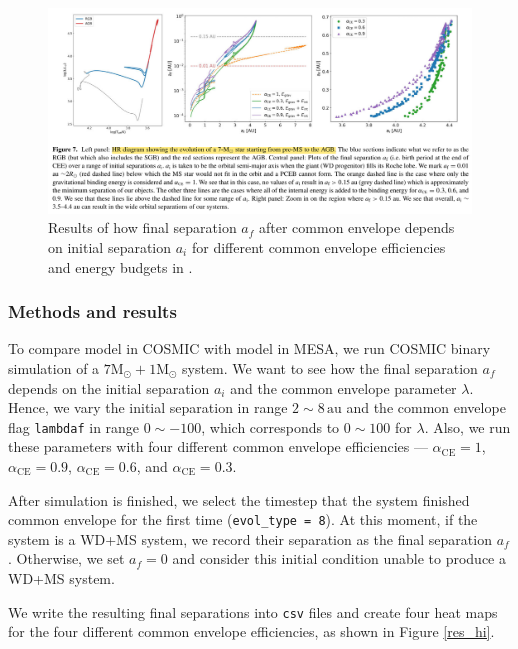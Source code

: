 \documentclass[12pt]{article}
\newcommand{\Msun}{\mathrm{M_{\odot}}}
\newcommand{\alphace}{\alpha_{\mathrm{CE}}}
\newcommand{\au}{\, \mathrm{au}}
\begin{document}
\begin{figure}
    \centering
    \includegraphics[width=\linewidth]{fig/yamaguchi-7+1.png}
    \caption{Results of how final separation $a_f$ after common envelope depends on initial separation $a_i$ for different common envelope efficiencies and energy budgets in \cite{yamaguchi_hi}.}
    \label{yam_hi}
\end{figure}

\subsubsection{Methods and results}
To compare model in COSMIC with model in MESA, we run COSMIC binary simulation of a $7\Msun + 1\Msun$ system. We want to see how the final separation $a_f$ depends on the initial separation $a_i$ and the common envelope parameter $\lambda$. Hence, we vary the initial separation in range $2 \sim 8 \au$ and the common envelope flag \verb|lambdaf| in range $0 \sim -100$, which corresponds to $0 \sim 100$ for $\lambda$. Also, we run these parameters with four different common envelope efficiencies — $\alphace = 1$, $\alphace = 0.9$, $\alphace = 0.6$, and $\alphace = 0.3$.

After simulation is finished, we select the timestep that the system finished common envelope for the first time (\verb|evol_type = 8|). At this moment, if the system is a WD+MS system, we record their separation as the final separation $a_f$. Otherwise, we set $a_f = 0$ and consider this initial condition unable to produce a WD+MS system.

We write the resulting final separations into \verb|csv| files and create four heat maps for the four different common envelope efficiencies, as shown in Figure \ref{res_hi}.
\end{document}
